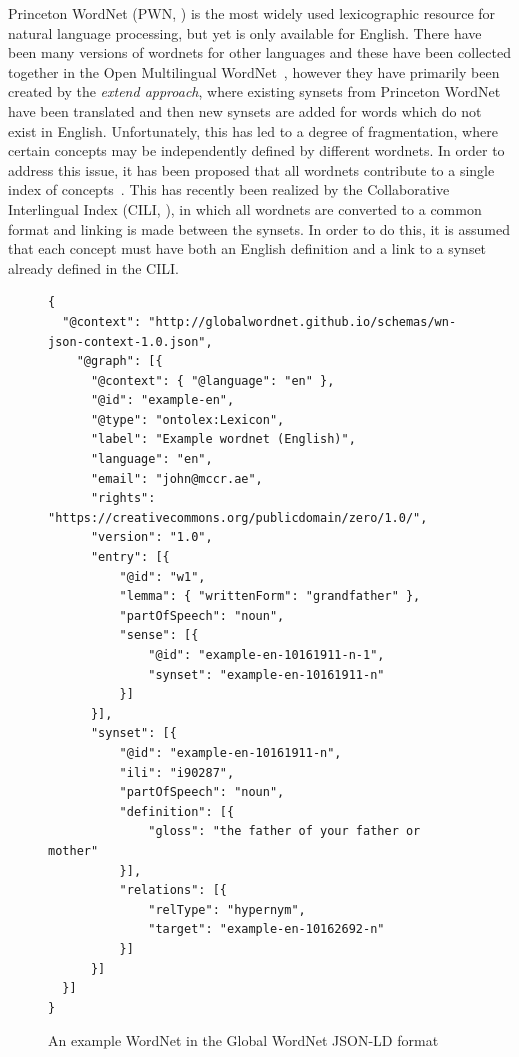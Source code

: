 \documentclass[12pt,a4paper]{elex2017}
\begin{document}
Princeton WordNet (PWN, \cite{fellbaum2010wordnet}) is the most widely used
lexicographic resource for natural language processing, but yet is only
available for English. There have been many versions of wordnets for other
languages and these have been collected together in the Open Multilingual
WordNet~\citep{bond2013linking}, however they have primarily been created by the
\emph{extend approach}, where existing synsets from Princeton WordNet have been
translated and then new synsets are added for words which do not exist in
English. Unfortunately, this has led to a degree of fragmentation, where certain
concepts may be independently defined by different wordnets. In order to address
this issue, it has been proposed that all wordnets contribute to a single index
of concepts~\citep{pease2008building}. This has recently been realized by the
Collaborative Interlingual Index (CILI, \cite{bond2016cili}), in which all
wordnets are converted to a common format and linking is made between the
synsets. In order to do this, it is assumed that each concept must have both an
English definition and a link to a synset already defined in the CILI. 

\begin{figure}
    \footnotesize
    \begin{verbatim}
{ 
  "@context": "http://globalwordnet.github.io/schemas/wn-json-context-1.0.json",
    "@graph": [{
      "@context": { "@language": "en" },
      "@id": "example-en",
      "@type": "ontolex:Lexicon", 
      "label": "Example wordnet (English)",
      "language": "en",
      "email": "john@mccr.ae",
      "rights": "https://creativecommons.org/publicdomain/zero/1.0/",
      "version": "1.0",
      "entry": [{
          "@id": "w1",
          "lemma": { "writtenForm": "grandfather" },
          "partOfSpeech": "noun",
          "sense": [{
              "@id": "example-en-10161911-n-1",
              "synset": "example-en-10161911-n"
          }]
      }],
      "synset": [{
          "@id": "example-en-10161911-n",
          "ili": "i90287",
          "partOfSpeech": "noun",
          "definition": [{
              "gloss": "the father of your father or mother"
          }],
          "relations": [{
              "relType": "hypernym",
              "target": "example-en-10162692-n"
          }]
      }]
  }]
}
    \end{verbatim}
    \caption{\label{fig:json-example}An example WordNet in the Global WordNet
    JSON-LD format}
\end{figure}
\end{document}
